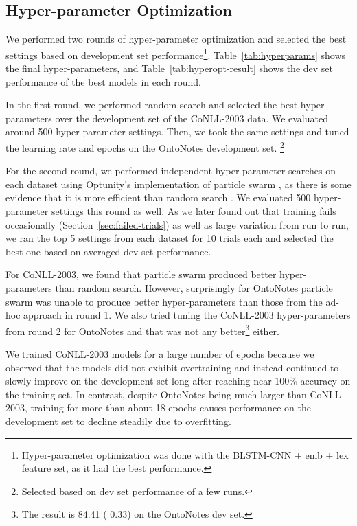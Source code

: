 \documentclass[11pt,letterpaper]{article}
\begin{document}
\subsection{Hyper-parameter Optimization}
\label{sec:hyperopt}

We performed two rounds of hyper-parameter optimization and selected the best settings based on development set performance\footnote{Hyper-parameter optimization was done with the BLSTM-CNN + emb + lex feature set, as it had the best performance.}. Table~\ref{tab:hyperparams} shows the final hyper-parameters, and Table~\ref{tab:hyperopt-result} shows the dev set performance of the best models in each round.  

In the first round, we performed random search and selected the best hyper-parameters over the development set of the CoNLL-2003 data. We evaluated around 500 hyper-parameter settings. Then, we took the same settings and tuned the learning rate and epochs on the OntoNotes development set.
\footnote{Selected based on dev set performance of a few runs.}

For the second round, we performed independent hyper-parameter searches on each dataset using Optunity's implementation of particle swarm \cite{claesen2014}, as there is some evidence that it is more efficient than random search \cite{clerc2002}. We evaluated 500 hyper-parameter settings this round as well. As we later found out that training fails occasionally (Section~\ref{sec:failed-trials}) as well as large variation from run to run, we ran the top 5 settings from each dataset for 10 trials each and selected the best one based on averaged dev set performance.

For CoNLL-2003, we found that particle swarm produced better hyper-parameters than random search. However, surprisingly for OntoNotes particle swarm was unable to produce better hyper-parameters than those from the ad-hoc approach in round 1. We also tried tuning the CoNLL-2003 hyper-parameters from round 2 for OntoNotes and that was not any better\footnote{The result is 84.41 ( 0.33) on the OntoNotes dev set.} either.

We trained CoNLL-2003 models for a large number of epochs because we observed that the models did not exhibit overtraining and instead continued to slowly improve on the development set long after reaching near 100\% accuracy on the training set. In contrast, despite OntoNotes being much larger than CoNLL-2003, training for more than about 18 epochs causes performance on the development set to decline steadily due to overfitting.
\end{document}
